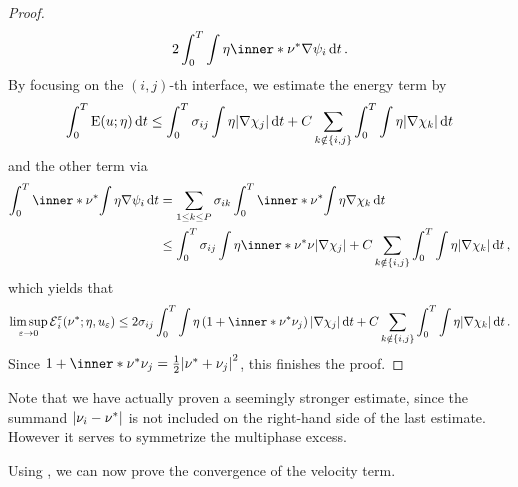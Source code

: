 \begin{proof}
\begin{equation*}
		2 \int_{ 0 }^{ T }
			\int
				\eta
				\inner*{ \nu^{ \ast } }{ \nabla \psi_{ i } }
		\dd{ t }.
	\end{equation*}
	By focusing on the $ ( i, j )$-th interface, we estimate the energy term by
	\begin{equation*}
		\int_{ 0 }^{ T }
			\operatorname{E} ( u ; \eta )
		\dd{ t }
		\leq
		\int_{ 0 }^{ T }
			\sigma_{ i j }
			\int
				\eta
			\abs{ \nabla \chi_{ j } }
		\dd{ t }
		+
		C \sum_{ k \notin \{ i , j \} }
			\int_{ 0 }^{ T }
				\int
					\eta
				\abs{ \nabla \chi_{ k } }
			\dd{ t }
	\end{equation*}
	and the other term via
	\begin{align*}
		\int_{ 0 }^{ T }
			\inner*{ \nu^{ \ast } }
			{
				\int
					\eta
				\nabla \psi_{ i }
			}
		\dd{ t }
		& =
		\sum_{ 1 \leq k \leq P }
			\sigma_{ i k }
			\int_{ 0 }^{ T }
				\inner*{ \nu^{ \ast } }
				{
					\int
						\eta 
					\nabla \chi_{ k }
				}
			\dd{ t }
		\\
		& \leq
		\int_{ 0 }^{ T }
			\sigma_{ i j }
			\int
				\eta
				\inner*{ \nu^{ \ast } }{ \nu }
			\abs{ \nabla \chi_{ j } }
		+
		C \sum_{ k \notin \{ i , j \} }
			\int_{ 0 }^{ T }
				\int
					\eta
				\abs{ \nabla \chi_{ k } }
			\dd{ t },
	\end{align*}
	which yields that
	\begin{equation*}
		\limsup_{ \varepsilon \to 0 }
			\tilt_excess_{ i }^{ \varepsilon } ( \nu^{ \ast } ; \eta , u_{ 
			\varepsilon } )
		\leq
		2 \sigma_{ i j } \int_{ 0 }^{ T }
			\int
				\eta
				\left( 1 + \inner*{ \nu^{ \ast } }{ \nu_{ j } } \right)
			\abs{ \nabla \chi_{ j } }
		\dd{ t }
		+
		C \sum_{ k \notin \{ i , j \} }
			\int_{ 0 }^{ T }
				\int
					\eta 
				\abs{ \nabla \chi_{ k } }
			\dd{ t }.
	\end{equation*}
	Since $ 1 + \inner*{ \nu^{ \ast } }{ \nu_{ j } } = \frac{ 1 }{ 2 } \abs{ 
	\nu^{ \ast } + \nu_{ j } }^{ 2 } $, this finishes the proof.
\end{proof}

Note that we have actually proven a seemingly stronger estimate, since the 
summand $ \abs{ \nu_{ i } - \nu^{ \ast } } $ is not included on the right-hand 
side of the last estimate. However it serves to symmetrize the multiphase 
excess.

Using , we can 
now prove the convergence of the velocity term.

